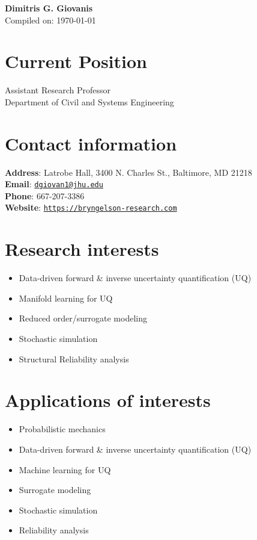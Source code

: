 



\begin{center}
    {\LARGE \bf Dimitris G. Giovanis} \\
    \medskip
    Compiled on: \today
\end{center}

\section*{Current Position}
\noindent
Assistant Research Professor\\
Department of Civil and Systems Engineering\\
 \JHU


\section*{Contact information}

\textbf{Address}: Latrobe Hall,  3400 N. Charles St., Baltimore, MD 21218\\
\textbf{Email}: \href{mailto:dgiovan1@jhu.edu}{\texttt{dgiovan1@jhu.edu}}\\
\textbf{Phone}: 667-207-3386\\
\textbf{Website}: \href{https://bryngelson-research.com}{\texttt{https://bryngelson-research.com}}


\section*{Research interests}

\begin{itemize}
	\item Data-driven forward \& inverse uncertainty quantification (UQ)
	\item Manifold learning for UQ
	\item Reduced order/surrogate modeling
	\item Stochastic simulation
	\item Structural Reliability analysis
	
\end{itemize}

\section*{Applications of interests}

\begin{itemize}
	\item Probabilistic mechanics
	\item Data-driven forward \& inverse uncertainty quantification (UQ)
	\item Machine learning for UQ
	\item Surrogate modeling
	\item Stochastic simulation
	\item Reliability analysis
	
\end{itemize}


